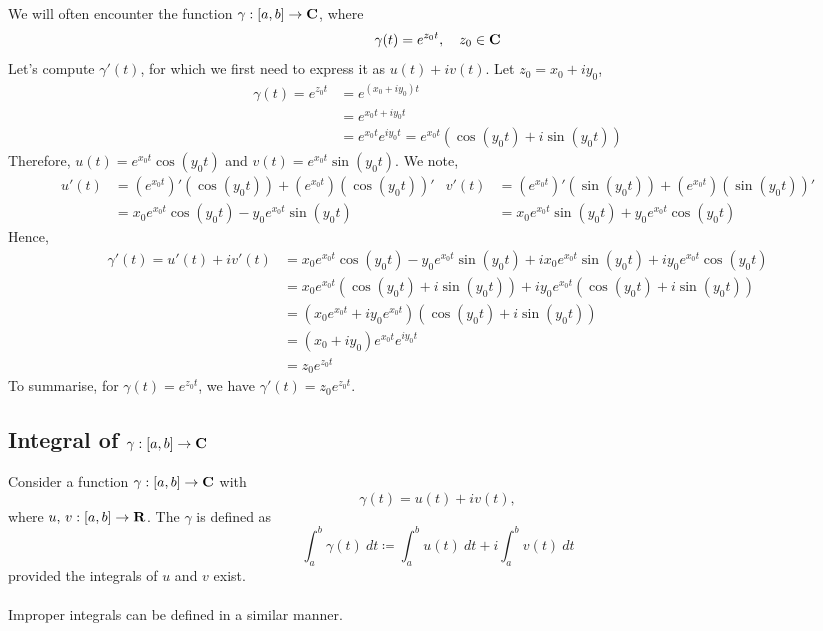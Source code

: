 \medskip

\begin{example}
We will often encounter the function $\gamma:[a,b] \to \mathbf C$, where
\[\gamma(t) = e^{z_0t},\quad z_0 \in \mathbf C\]
Let's compute $\gamma'(t)$, for which we first need to express it as $u(t) + iv(t)$. Let $z_0 = x_0 + iy_0$,
\begin{align*}
\gamma(t) = e^{z_0t} &= e^{(x_0 + iy_0)t}\\[0.5em]
&= e^{x_0t + iy_0t}\\[0.5em]
&= e^{x_0t}e^{iy_0t} = e^{x_0t}(\cos(y_0t) + i\sin(y_0t))
\end{align*}
Therefore, $u(t) = e^{x_0t}\cos(y_0t)$ and $v(t) = e^{x_0t}\sin(y_0t)$. We note,
\begin{align*}
u'(t) &= (e^{x_0t})'(\cos(y_0t)) + (e^{x_0t})(\cos(y_0t))' & v'(t) &= (e^{x_0t})'(\sin(y_0t)) + (e^{x_0t})(\sin(y_0t))'\\[0.5em]
 &= x_0e^{x_0t}\cos(y_0t) - y_0e^{x_0t}\sin(y_0t) & &= x_0e^{x_0t}\sin(y_0t) + y_0e^{x_0t}\cos(y_0t)
\end{align*}
Hence, 
\begin{align*}
\gamma'(t) = u'(t) + iv'(t) &= x_0e^{x_0t}\cos(y_0t) - y_0e^{x_0t}\sin(y_0t) + ix_0e^{x_0t}\sin(y_0t) + iy_0e^{x_0t}\cos(y_0t)\\[0.5em]
&= x_0e^{x_0t}(\cos(y_0t) + i\sin(y_0t)) + iy_0e^{x_0t}(\cos(y_0t) + i\sin(y_0t))\\[0.5em]
&= (x_0e^{x_0t} + iy_0e^{x_0t})(\cos(y_0t) + i\sin(y_0t))\\[0.5em]
&= (x_0 + iy_0)e^{x_0t}e^{iy_0t}\\[0.5em]
&= z_0e^{z_0t}
\end{align*}
To summarise, for $\gamma(t) = e^{z_0t}$, we have $\gamma'(t) = z_0e^{z_0t}$.
\end{example}

\bigskip

\subsection{Integral of $\gamma:[a,b] \to \mathbf C$}

\begin{definition}
Consider a function $\gamma:[a,b] \to \mathbf C$ with \[\gamma(t) = u(t) + iv(t),\] where $u,\,v: [a,b] \to \mathbf R$. The  {\color{darkred}$\gamma$} is defined as
\[\int_a^b\gamma(t)\ dt \coloneqq \int_a^bu(t)\ dt + i\int_a^bv(t)\ dt\]
provided the integrals of $u$ and $v$ exist.\\
\\
Improper integrals can be defined in a similar manner.
\end{definition}

